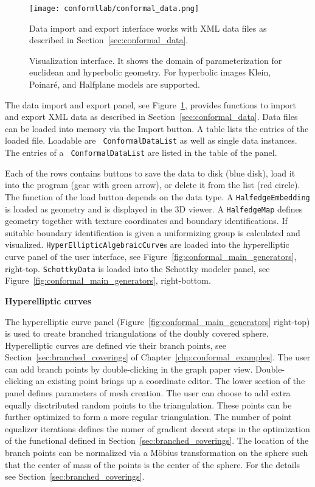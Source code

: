 \documentclass[Thesis.tex]{subfiles}
\begin{document}
\begin{figure}
\centering
\texttt{[image: conformllab/conformal\_data.png]}
\caption{Data import and export interface works with XML data files as described in 
Section~\ref{sec:conformal_data}.}
\label{fig:data_interface}
\end{figure}

\begin{figure}
\caption{Visualization interface. It shows the domain of parameterization for 
euclidean and hyperbolic geometry. For hyperbolic images Klein, Poinar\'e, and 
Halfplane models are supported.}
\label{fig:visualization_interfaces}
\end{figure}

The data import and export panel, see Figure~\ref{fig:data_interface}, provides
functions to import and export XML data as described in
Section~\ref{sec:conformal_data}.  Data files can be loaded into memory via the
Import button. A table lists the entries of the loaded file.  Loadable are {\tt
ConformalDataList} as well as single data instances. The entries of a {\tt
ConformalDataList} are listed in the table of the panel. 

Each of the rows
contains buttons to save the data to disk (blue disk), load it into the program
(gear with green arrow), or delete it from the list (red circle).  The function
of the load button depends on the data type. A {\tt HalfedgeEmbedding} is
loaded as geometry and is displayed in the 3D viewer. A {\tt HalfedgeMap}
defines geometry together with texture coordinates and boundary
identifications. If suitable boundary identification is given a uniformizing
group is calculated and visualized. {\tt HyperEllipticAlgebraicCurve}s are
loaded into the hyperelliptic curve panel of the user interface, see
Figure~\ref{fig:conformal_main_generators}, right-top.  {\tt SchottkyData} is loaded into
the Schottky modeler panel, see Figure~\ref{fig:conformal_main_generators}, right-bottom.


{\bf Hyperelliptic curves}

The hyperelliptic curve panel (Figure~\ref{fig:conformal_main_generators} right-top) is used to create branched triangulations of the doubly covered sphere.
Hyperelliptic curves are defined vie their branch points, see Section~\ref{sec:branched_coverings} of Chapter~\ref{chp:conformal_examples}.
The user can add branch points by double-clicking in the graph paper view.
Double-clicking an existing point brings up a coordinate editor. 
The lower section of the panel defines parameters of mesh creation. 
The user can choose to add extra equally disctributed random points to the triangulation.
These points can be further optimized to form a more regular triangulation.
The number of point equalizer iterations defines the numer of gradient decent steps in the optimization of the functional defined in Section~\ref{sec:branched_coverings}.  
The location of the branch points can be normalized via a M{\"o}bius transformation on the sphere such that the center of mass of the points is the center of the sphere. For the details see Section~\ref{sec:branched_coverings}.
\end{document}
